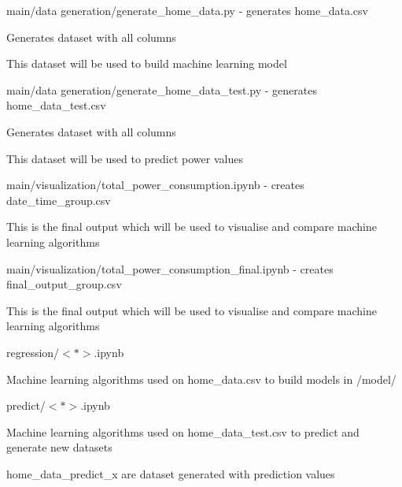 \begin{DoxyEnumerate}
\item {\ttfamily main/data generation/generate\+\_\+home\+\_\+data.\+py} -\/ generates {\ttfamily home\+\_\+data.\+csv}
\begin{DoxyItemize}
\item Generates dataset with all columns
\item This dataset will be used to build machine learning model
\end{DoxyItemize}
\item {\ttfamily main/data generation/generate\+\_\+home\+\_\+data\+\_\+test.\+py} -\/ generates {\ttfamily home\+\_\+data\+\_\+test.\+csv}
\begin{DoxyItemize}
\item Generates dataset with all columns
\item This dataset will be used to predict power values
\end{DoxyItemize}
\item {\ttfamily main/visualization/total\+\_\+power\+\_\+consumption.\+ipynb} -\/ creates {\ttfamily date\+\_\+time\+\_\+group.\+csv}
\begin{DoxyItemize}
\item This is the final output which will be used to visualise and compare machine learning algorithms
\end{DoxyItemize}
\item {\ttfamily main/visualization/total\+\_\+power\+\_\+consumption\+\_\+final.\+ipynb} -\/ creates {\ttfamily final\+\_\+output\+\_\+group.\+csv}
\begin{DoxyItemize}
\item This is the final output which will be used to visualise and compare machine learning algorithms
\end{DoxyItemize}
\item {\ttfamily regression/$<$$\ast$$>$.ipynb}
\begin{DoxyItemize}
\item Machine learning algorithms used on {\ttfamily home\+\_\+data.\+csv} to build models in {\ttfamily /model/}
\end{DoxyItemize}
\item {\ttfamily predict/$<$$\ast$$>$.ipynb}
\begin{DoxyItemize}
\item Machine learning algorithms used on {\ttfamily home\+\_\+data\+\_\+test.\+csv} to predict and generate new datasets
\item {\ttfamily home\+\_\+data\+\_\+predict\+\_\+x} are dataset generated with prediction values
\end{DoxyItemize}
\end{DoxyEnumerate}
